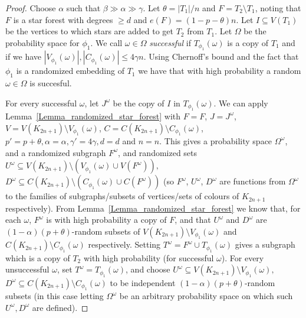 \begin{proof}
Choose $\alpha$ such that $\beta\gg \alpha \gg \gamma $. Let $\theta =|T_1|/n$ and $F=T_2\setminus T_1$, noting that $F$ is a star forest with degrees $\geq d$ and $e(F)=(1-p-\theta)n$. Let $I\subseteq V(T_1)$ be the vertices to which stars are added to get $T_2$ from $T_1$.
Let $\Omega$ be the probability space for $\phi_1$.
We call $\omega\in \Omega$ \emph{successful} if $T_{\phi_1}(\omega)$ is a copy of $T_1$ and if we have $|V_{\phi_1}(\omega)|, |C_{\phi_1}(\omega)|\leq 4\gamma n$.
Using Chernoff's bound and the fact that  $\phi_1$ is a randomized embedding of $T_1$ we have that with high probability a random $\omega \in \Omega$ is succesful.


For every successful $\omega$, let $J^{\omega}$ be the copy of $I$ in $T_{\phi_1}(\omega)$.
We can apply Lemma~\ref{Lemma_randomized_star_forest} with $F=F$, $J=J^{\omega}$,
$V=V(K_{2n+1})\setminus V_{\phi_1}(\omega)$, $C=C(K_{2n+1})\setminus C_{\phi_1}(\omega)$, $p'=p+\theta, \alpha=\alpha, \gamma'=4\gamma, d=d$ and $n=n$. This gives a probability space $\Omega^\omega$, and a randomized subgraph $F^{\omega}$, and randomized sets
$U^\omega\subseteq V(K_{2n+1})\setminus (V_{\phi_1}(\omega)\cup V(F^{\omega})),$ $D^{\omega}\subseteq  C(K_{2n+1})\setminus (C_{\phi_1}(\omega)\cup C(F^{\omega}))$ (so $F^{\omega}$, $U^\omega$, $D^{\omega}$ are functions from $\Omega^{\omega}$ to the families of subgraphs/subsets of vertices/sets of colours of $K_{2n+1}$ respectively). From Lemma~\ref{Lemma_randomized_star_forest} we know that, for each $\omega$,  $F^{\omega}$ is with high probability a copy of $F$, and that $U^{\omega}$ and $D^{\omega}$ are $(1-\alpha)(p+\theta)$-random subsets of $V(K_{2n+1})\setminus V_{\phi_1}(\omega)$ and $C(K_{2n+1})\setminus C_{\phi_1}(\omega)$ respectively. Setting $T^{\omega}=F^{\omega}\cup T_{\phi_1}(\omega)$ gives a subgraph which is a copy of $T_2$ with high probability (for successful $\omega$).
For every unsuccessful $\omega$, set $T^{\omega}=T_{\phi_1}(\omega)$, and choose  $U^\omega\subseteq V(K_{2n+1})\setminus V_{\phi_1}(\omega),$ $D^{\omega}\subseteq  C(K_{2n+1})\setminus C_{\phi_1}(\omega)$ to be independent $(1-\alpha)(p+\theta)$-random  subsets (in this case letting $\Omega^{\omega}$ be an arbitrary probability space on which such $U^{\omega}, D^{\omega}$ are defined).




\end{proof}
